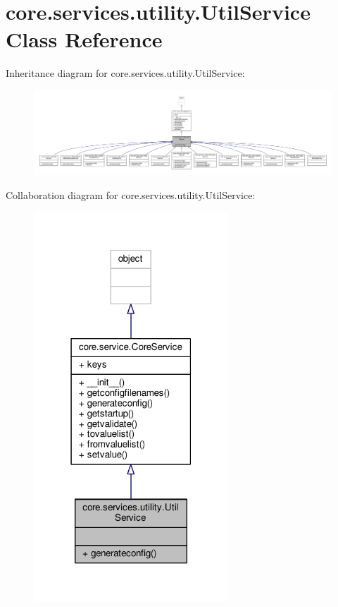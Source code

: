\hypertarget{classcore_1_1services_1_1utility_1_1_util_service}{\section{core.\+services.\+utility.\+Util\+Service Class Reference}
\label{classcore_1_1services_1_1utility_1_1_util_service}
}


Inheritance diagram for core.\+services.\+utility.\+Util\+Service\+:
\nopagebreak
\begin{figure}[H]
\begin{center}
\leavevmode
\includegraphics[width=350pt]{classcore_1_1services_1_1utility_1_1_util_service__inherit__graph}
\end{center}
\end{figure}


Collaboration diagram for core.\+services.\+utility.\+Util\+Service\+:
\nopagebreak
\begin{figure}[H]
\begin{center}
\leavevmode
\includegraphics[width=207pt]{classcore_1_1services_1_1utility_1_1_util_service__coll__graph}
\end{center}
\end{figure}
